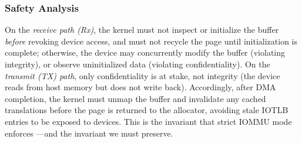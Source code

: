\subsubsection{Safety Analysis}
\label{vfree:sec:security}


On the {\it receive path (Rx)},
    the kernel must not inspect or initialize the buffer {\it before} revoking device access, 
    and must not recycle the page until initialization is complete;
otherwise, the device may concurrently modify the buffer (violating integrity), 
or observe uninitialized data (violating confidentiality).
On the {\it transmit (TX) path}, only confidentiality is at stake, not integrity
    (the device reads from host memory but does not write back). 
Accordingly, after DMA completion, the kernel must unmap the buffer
    and invalidate any cached translations before the page is returned to the allocator,
    avoiding stale IOTLB entries to be exposed to devices.
This is the invariant that strict IOMMU mode enforces ---and the invariant we must preserve.
\fi 

